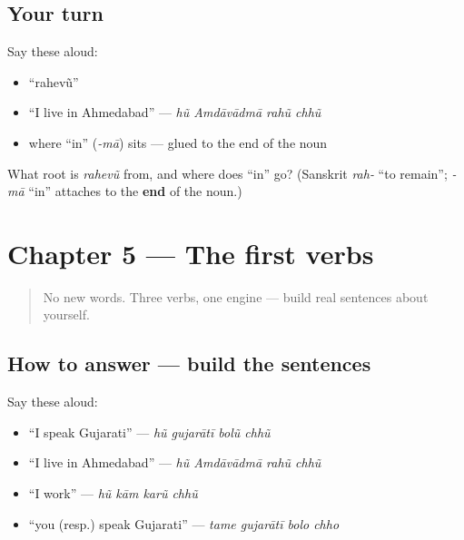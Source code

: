 \subsection*{Your turn}
Say these aloud:

\begin{itemize}
\raggedright
  \item \textquotedblleft{}rahevũ\textquotedblright{}
  \item \textquotedblleft{}I live in Ahmedabad\textquotedblright{} — \emph{hũ Amdāvādmā rahũ chhũ}
  \item where \textquotedblleft{}in\textquotedblright{} (\emph{-mā}) sits — glued to the end of the noun
\end{itemize}

\begin{tcolorbox}[breakable,colback=teal!4,colframe=teal!35!black,title={Before you move on}]
What root is \emph{rahevũ} from, and where does \textquotedblleft{}in\textquotedblright{} go? (Sanskrit \emph{rah-} \textquotedblleft{}to remain\textquotedblright{}; \emph{-mā} \textquotedblleft{}in\textquotedblright{} attaches to the \textbf{end} of the noun.)
\end{tcolorbox}
\section[Practice]{Chapter 5 — The first verbs}

\label{lesson:GU-C05-practice}



\begin{quote}
No new words. Three verbs, one engine — build real sentences about yourself.
\end{quote}

\subsection*{How to answer — build the sentences}
Say these aloud:

\begin{itemize}
\raggedright
  \item \textquotedblleft{}I speak Gujarati\textquotedblright{} — \emph{hũ gujarātī bolũ chhũ}
  \item \textquotedblleft{}I live in Ahmedabad\textquotedblright{} — \emph{hũ Amdāvādmā rahũ chhũ}
  \item \textquotedblleft{}I work\textquotedblright{} — \emph{hũ kām karũ chhũ}
  \item \textquotedblleft{}you (resp.) speak Gujarati\textquotedblright{} — \emph{tame gujarātī bolo chho}
\end{itemize}

